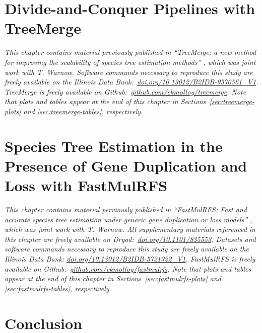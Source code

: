 \documentclass[tocnosub, noragright, centerchapter, fullpagesingle, 12pt]{uiuc_csthesis18}
\numberwithin{algocf}{chapter}
\theoremstyle{definition}
\begin{document}
\chapter{Divide-and-Conquer Pipelines with TreeMerge}
\label{chapter:treemerge}
\textit{This chapter contains material previously published in ``TreeMerge: a new method for improving the scalability of species tree estimation methods'' \cite{molloy2019treemerge}, which was joint work with T. Warnow.
Software commands necessary to reproduce this study are freely available on the Illinois Data Bank:~\href{https://doi.org/10.13012/B2IDB-9570561_V1}{doi.org/10.13012/B2IDB-9570561\_V1}.
\emph{TreeMerge} is freely available on Github:~\href{https://github.com/ekmolloy/treemerge}{github.com/ekmolloy/treemerge}.
Note that plots and tables appear at the end of this chapter in Sections~\ref{sec:treemerge-plots} and \ref{sec:treemerge-tables}, respectively.}



\chapter{Species Tree Estimation in the Presence of Gene Duplication and Loss with FastMulRFS}
\label{chapter:fastmulrfs}
{\em This chapter contains material perviously published in ``FastMulRFS: Fast and accurate species tree estimation under generic gene duplication or loss models'' \cite{molloy2020fastmulrfs}, which was joint work with T. Warnow.
All supplementary materials referenced in this chapter are freely available on Dryad:~\href{https://doi.org/10.1101/835553}{doi.org/10.1101/835553}.
Datasets and software commands necessary to reproduce this study are freely available on the Illinois Data Bank: \href{https://doi.org/10.13012/B2IDB-5721322_V1}{doi.org/10.13012/B2IDB-5721322\_V1}.
\emph{FastMulRFS} is freely available on Github:~\href{https://github.com/ekmolloy/fastmulrfs}{github.com/ekmolloy/fastmulrfs}.
Note that plots and tables appear at the end of this chapter in Sections~\ref{sec:fastmulrfs-plots} and \ref{sec:fastmulrfs-tables}, respectively.}



\chapter{Conclusion}
\label{chapter:conclusion}


%



%
\appendix

\printnoidxglossary[type = \acronymtype, title={LIST OF ACRONYMS}]  %
\printnoidxglossary[title={LIST OF TERMS}]   %

\backmatter
\end{document}
